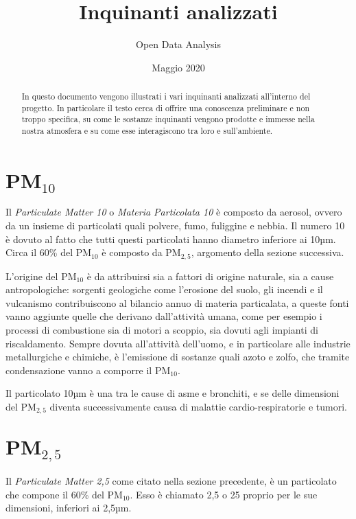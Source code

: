 \documentclass[12pt, letterpaper]{article}
\title{Inquinanti analizzati}
\author{Open Data Analysis}
\date{Maggio 2020}
\begin{document}
\begin{titlepage}
	\maketitle
	\begin{abstract}
	In questo documento vengono illustrati i vari inquinanti analizzati all'interno del 		progetto. In particolare il testo cerca di offrire una conoscenza preliminare e non 		troppo specifica, su come le sostanze inquinanti vengono prodotte e immesse nella 			nostra atmosfera e su come esse interagiscono tra loro e sull'ambiente.
	\end{abstract}
\end{titlepage}

\section{$\textbf{PM}_{10}$}
Il \textit{Particulate Matter 10} o \textit{Materia Particolata 10} è composto da aerosol, ovvero da un insieme di particolati quali polvere, fumo, fuliggine e nebbia. Il numero 10 è dovuto al fatto che tutti questi particolati hanno diametro inferiore ai 10µm. Circa il 60\% del $\textrm{PM}_{10}$ è composto da $\textrm{PM}_{2,5}$, argomento della sezione successiva.

L'origine del $\textrm{PM}_{10}$ è da attribuirsi sia a fattori di origine naturale, sia a cause antropologiche: sorgenti geologiche come l'erosione del suolo, gli incendi e il vulcanismo contribuiscono al bilancio annuo di materia particalata, a queste fonti vanno aggiunte quelle che derivano dall'attività umana, come per esempio i processi di combustione sia di motori a scoppio, sia dovuti agli impianti di riscaldamento.
Sempre dovuta all'attività dell'uomo, e in particolare alle industrie metallurgiche e chimiche, è l'emissione di sostanze quali azoto e zolfo, che tramite condensazione vanno a comporre il $\textrm{PM}_{10}$.

Il particolato 10µm è una tra le cause di asme e bronchiti, e se delle dimensioni del $\textrm{PM}_{2,5}$ diventa successivamente causa di malattie cardio-respiratorie e tumori.

\section{$\textbf{PM}_{2,5}$}
Il \textit{Particulate Matter 2,5} come citato nella sezione precedente, è un particolato che compone il 60\% del $\textrm{PM}_{10}$. Esso è chiamato 2,5 o 25 proprio per le sue dimensioni, inferiori ai 2,5µm.
\end{document}
